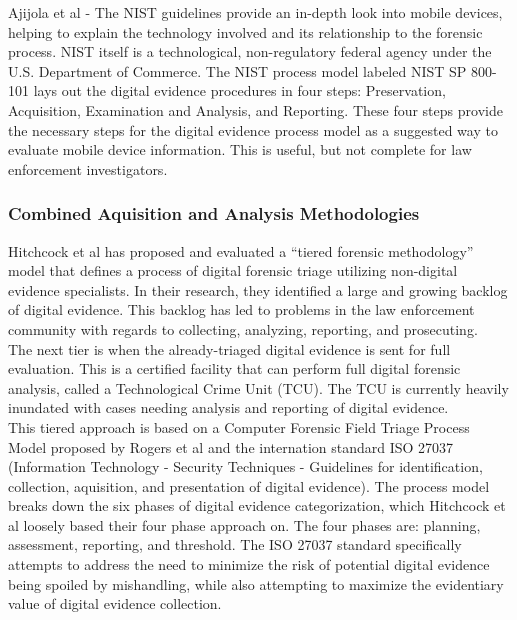 \documentclass[12pt]{article}
\begin{document}
Ajijola et al\cite{ajijola2014review} - The NIST guidelines provide an in-depth look into mobile
devices, helping to explain the technology involved and its
relationship to the forensic process.  NIST itself is a technological, non-regulatory federal agency under the U.S.
Department of Commerce.  The NIST process model labeled NIST SP 800-101 lays out the digital evidence procedures in
four steps: Preservation, Acquisition, Examination and Analysis, and Reporting.  These four steps provide the
necessary steps for the digital evidence process model as a suggested way to evaluate mobile device information.  This
is useful, but not complete for law enforcement investigators.\\

\subsubsection{Combined Aquisition and Analysis Methodologies}
Hitchcock et al\cite{hitchcock2016tiered} has proposed and evaluated a ``tiered forensic methodology'' model that defines
a process of digital forensic triage utilizing non-digital evidence specialists.  In their research, they identified
a large and growing backlog of digital evidence.  This backlog has led to problems in the law enforcement community
with regards to collecting, analyzing, reporting, and prosecuting.\\

The next tier is when the already-triaged digital evidence is sent for full evaluation.  This is a certified facility
that can perform full digital forensic analysis, called a Technological Crime Unit (TCU).  The TCU is currently
heavily inundated with cases needing analysis and reporting of digital evidence.\\

This tiered approach is based on a Computer Forensic Field Triage Process Model proposed by Rogers et al
\cite{rogers2006computer} and the internation standard ISO 27037 (Information Technology - Security Techniques - 
Guidelines for identification, collection, aquisition, and presentation of digital evidence). The process model 
breaks down the six phases of digital evidence categorization, which Hitchcock et al\cite{hitchcock2016tiered} loosely
based their four phase approach on.  The four phases are: planning, assessment, reporting, and threshold.  The ISO
27037 standard specifically attempts to address the need to minimize the risk of potential digital evidence being
spoiled by mishandling, while also attempting to maximize the evidentiary value of digital evidence collection.\\
\end{document}
